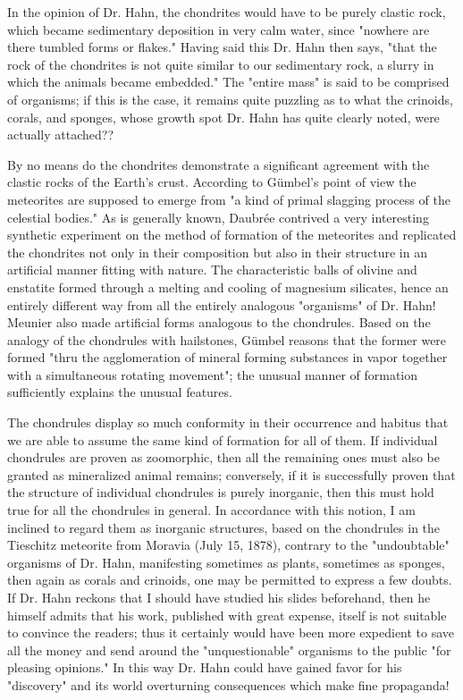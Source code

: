 \documentclass[a4paper, 12pt, oneside]{article}
\begin{document}
In the opinion of Dr. Hahn, the chondrites would have to be purely clastic rock, which became sedimentary deposition in very calm water, since "nowhere are there tumbled forms or flakes." Having said this Dr. Hahn then says, "that the rock of the chondrites is not quite similar to our sedimentary rock, a slurry in which the animals became embedded." The "entire mass" is said to be comprised of organisms; if this is the case, it remains quite puzzling as to what the crinoids, corals, and sponges, whose growth spot Dr. Hahn has quite clearly noted, were actually attached??

By no means do the chondrites demonstrate a significant agreement with the clastic rocks of the Earth's crust. According to Gümbel's point of view the meteorites are supposed to emerge from "a kind of primal slagging process of the celestial bodies." As is generally known, Daubrée contrived a very interesting synthetic experiment on the method of formation of the meteorites and replicated the chondrites not only in their composition but also in their structure in an artificial manner fitting with nature. The characteristic balls of olivine and enstatite formed through a melting and cooling of magnesium silicates, hence an entirely different way from all the entirely analogous "organisms" of Dr. Hahn! Meunier also made artificial forms analogous to the chondrules. Based on the analogy of the chondrules with hailstones, Gümbel reasons that the former were formed "thru the agglomeration of mineral forming substances in vapor together with a simultaneous rotating movement"; the unusual manner of formation sufficiently explains the unusual features.

The chondrules display so much conformity in their occurrence and habitus that we are able to assume the same kind of formation for all of them. If individual chondrules are proven as zoomorphic, then all the remaining ones must also be granted as mineralized animal remains; conversely, if it is successfully proven that the structure of individual chondrules is purely inorganic, then this must hold true for all the chondrules in general. In accordance with this notion, I am inclined to regard them as inorganic structures, based on the chondrules in the Tieschitz meteorite from Moravia (July 15, 1878), contrary to the "undoubtable" organisms of Dr. Hahn, manifesting sometimes as plants, sometimes as sponges, then again as corals and crinoids, one may be permitted to express a few doubts. If Dr. Hahn reckons that I should have studied his slides beforehand, then he himself admits that his work, published with great expense, itself is not suitable to convince the readers; thus it certainly would have been more expedient to save all the money and send around the "unquestionable" organisms to the public "for pleasing opinions." In this way Dr. Hahn could have gained favor for his "discovery" and its world overturning consequences which make fine propaganda!
\end{document}
